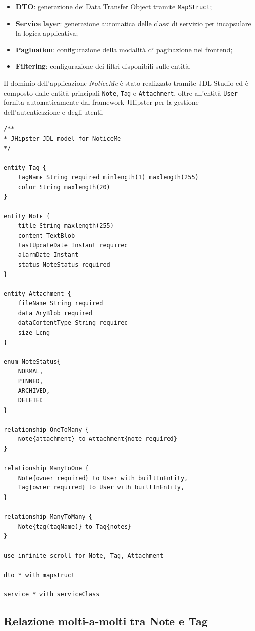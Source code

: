 \begin{itemize}
	\item \textbf{DTO}: generazione dei Data Transfer Object tramite \texttt{MapStruct};
	\item \textbf{Service layer}: generazione automatica delle classi di servizio per incapsulare la logica applicativa;
	\item \textbf{Pagination}: configurazione della modalità di paginazione nel frontend;
	\item \textbf{Filtering}: configurazione dei filtri disponibili sulle entità.
\end{itemize}

Il dominio dell'applicazione \textit{NoticeMe} è stato realizzato tramite JDL Studio ed è composto dalle entità principali \texttt{Note}, \texttt{Tag} e \texttt{Attachment}, oltre all'entità \texttt{User} fornita automaticamente dal framework JHipster per la gestione dell'autenticazione e degli utenti.

\begin{lstlisting}[language=JDL,caption={Modello di dominio definito tramite JHipster Domain Language},label={lst:jdl-noticeme}]
/**
* JHipster JDL model for NoticeMe
*/

entity Tag {
	tagName String required minlength(1) maxlength(255)
	color String maxlength(20)
}

entity Note {
	title String maxlength(255)
	content TextBlob
	lastUpdateDate Instant required
	alarmDate Instant
	status NoteStatus required
}

entity Attachment {
	fileName String required
	data AnyBlob required
	dataContentType String required
	size Long
}

enum NoteStatus{
	NORMAL,
	PINNED,
	ARCHIVED,
	DELETED
}

relationship OneToMany {
	Note{attachment} to Attachment{note required}
}

relationship ManyToOne {
	Note{owner required} to User with builtInEntity,
	Tag{owner required} to User with builtInEntity,
}

relationship ManyToMany {
	Note{tag(tagName)} to Tag{notes}
}

use infinite-scroll for Note, Tag, Attachment

dto * with mapstruct

service * with serviceClass
\end{lstlisting}

\subsection{Relazione molti-a-molti tra Note e Tag}
\label{subsec:moltimolti-note-tag}

